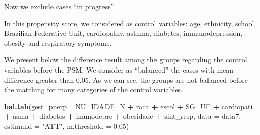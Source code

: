 \documentclass[
]{article}
\newenvironment{Shaded}{\begin{snugshade}}{\end{snugshade}}
\newcommand{\DataTypeTok}[1]{\textcolor[rgb]{0.13,0.29,0.53}{#1}}
\newcommand{\DecValTok}[1]{\textcolor[rgb]{0.00,0.00,0.81}{#1}}
\newcommand{\FloatTok}[1]{\textcolor[rgb]{0.00,0.00,0.81}{#1}}
\newcommand{\KeywordTok}[1]{\textcolor[rgb]{0.13,0.29,0.53}{\textbf{#1}}}
\newcommand{\NormalTok}[1]{#1}
\newcommand{\OperatorTok}[1]{\textcolor[rgb]{0.81,0.36,0.00}{\textbf{#1}}}
\newcommand{\OtherTok}[1]{\textcolor[rgb]{0.56,0.35,0.01}{#1}}
\newcommand{\StringTok}[1]{\textcolor[rgb]{0.31,0.60,0.02}{#1}}
\begin{document}
\begin{Shaded}
\end{Shaded}

Now we exclude cases ``in progress''.

\begin{Shaded}
\end{Shaded}

In this propensity score, we considered as control variables: age,
ethnicity, school, Brazilian Federative Unit, cardiopathy, asthma,
diabetes, immunodepression, obesity and respiratory symptoms.

We present below the difference result among the groups regarding the
control variables before the PSM. We consider as ``balanced'' the cases
with mean difference greater than 0.05. As we can see, the groups are
not balanced before the matching for many categories of the control
variables.

\begin{Shaded}
\begin{Highlighting}[]
\KeywordTok{bal.tab}\NormalTok{(gest_puerp }\OperatorTok{~}\StringTok{ }\NormalTok{NU_IDADE_N }\OperatorTok{+}\StringTok{ }\NormalTok{raca }\OperatorTok{+}\StringTok{ }\NormalTok{escol }\OperatorTok{+}\StringTok{ }\NormalTok{SG_UF }\OperatorTok{+}\StringTok{ }\NormalTok{cardiopati }\OperatorTok{+}\StringTok{ }\NormalTok{asma }\OperatorTok{+}\StringTok{ }
\StringTok{                    }\NormalTok{diabetes }\OperatorTok{+}\StringTok{ }\NormalTok{imunodepre }\OperatorTok{+}\StringTok{ }\NormalTok{obesidade }\OperatorTok{+}\StringTok{ }\NormalTok{sint_resp, }\DataTypeTok{data =}\NormalTok{ data7, }\DataTypeTok{estimand =} \StringTok{"ATT"}\NormalTok{, }\DataTypeTok{m.threshold =} \FloatTok{0.05}\NormalTok{)}
\end{Highlighting}
\end{Shaded}
\end{document}
